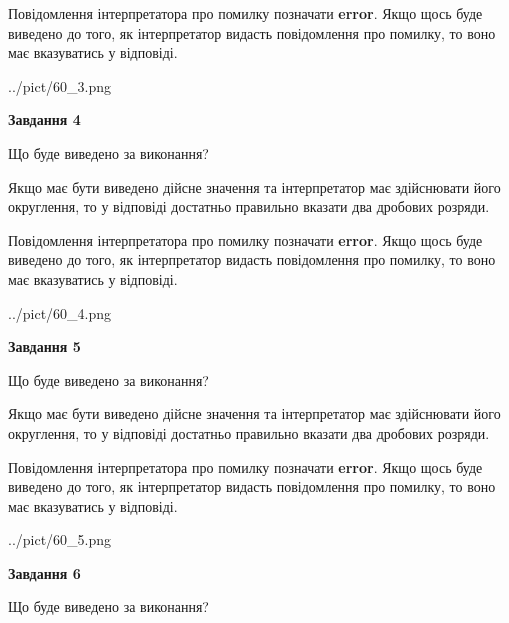 \documentclass[12pt, ukrainian]{article}
\begin{document}
{\begin {Large}
Повідомлення інтерпретатора про помилку позначати \textbf{error}.
Якщо щось буде виведено до того, як інтерпретатор видасть повідомлення про помилку, 
то воно має вказуватись у відповіді. \par

\begin{center}
	{../pict/60_3.png}
\end{center}
\newpage

{\begin {center}\textbf{Завдання 4}\end {center}}\par
Що буде виведено за виконання? \par

Якщо має бути виведено дійсне значення та інтерпретатор має здійснювати його округлення, 
то у відповіді достатньо правильно вказати два дробових розряди.

Повідомлення інтерпретатора про помилку позначати \textbf{error}.
Якщо щось буде виведено до того, як інтерпретатор видасть повідомлення про помилку, 
то воно має вказуватись у відповіді. \par

\begin{center}
	{../pict/60_4.png}
\end{center}
\newpage

{\begin {center}\textbf{Завдання 5}\end {center}}\par
Що буде виведено за виконання? \par

Якщо має бути виведено дійсне значення та інтерпретатор має здійснювати його округлення, 
то у відповіді достатньо правильно вказати два дробових розряди.

Повідомлення інтерпретатора про помилку позначати \textbf{error}.
Якщо щось буде виведено до того, як інтерпретатор видасть повідомлення про помилку, 
то воно має вказуватись у відповіді. \par

\begin{center}
	{../pict/60_5.png}
\end{center}
\newpage

{\begin {center}\textbf{Завдання 6}\end {center}}\par
Що буде виведено за виконання? \par


\end{Large}}
\end{document}
